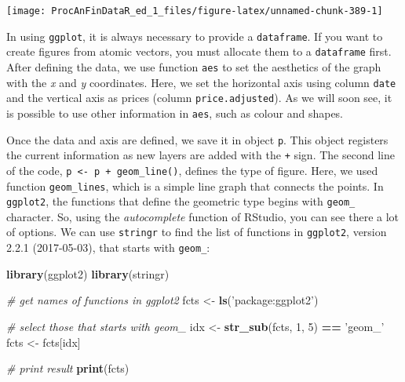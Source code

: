 \documentclass[11pt,]{book}
\newenvironment{Shaded}{\begin{snugshade}}{\end{snugshade}}
\newcommand{\KeywordTok}[1]{\textcolor[rgb]{0.27,0.27,0.27}{\textbf{#1}}}
\newcommand{\DecValTok}[1]{\textcolor[rgb]{0.06,0.06,0.06}{#1}}
\newcommand{\StringTok}[1]{\textcolor[rgb]{0.5,0.5,0.5}{#1}}
\newcommand{\CommentTok}[1]{\textcolor[rgb]{0.56,0.35,0.01}{\textit{#1}}}
\newcommand{\OperatorTok}[1]{\textcolor[rgb]{0.81,0.36,0.00}{\textbf{#1}}}
\newcommand{\NormalTok}[1]{#1}
\begin{document}
\begin{center}\texttt{[image: ProcAnFinDataR\_ed\_1\_files/figure-latex/unnamed-chunk-389-1]} \end{center}

In using \texttt{ggplot}, it is always necessary to provide a
\texttt{dataframe}. If you want to create figures from atomic vectors,
you must allocate them to a \texttt{dataframe} first. After defining the
data, we use function \texttt{aes} to set the aesthetics of the graph
with the \emph{x} and \emph{y} coordinates. Here, we set the horizontal
axis using column \texttt{date} and the vertical axis as prices (column
\texttt{price.adjusted}). As we will soon see, it is possible to use
other information in \texttt{aes}, such as colour and shapes.

Once the data and axis are defined, we save it in object \texttt{p}.
This object registers the current information as new layers are added
with the \texttt{+} sign. The second line of the code,
\texttt{p\ \textless{}-\ p\ +\ geom\_line()}, defines the type of
figure. Here, we used function \texttt{geom\_lines}, which is a simple
line graph that connects the points. In \texttt{ggplot2}, the functions
that define the geometric type begins with \texttt{geom\_} character.
So, using the \emph{autocomplete} function of RStudio, you can see there
a lot of options. We can use \texttt{stringr} to find the list of
functions in \texttt{ggplot2}, version 2.2.1 (2017-05-03), that starts
with \texttt{geom\_}: 

\begin{Shaded}
\begin{Highlighting}[]
\KeywordTok{library}\NormalTok{(ggplot2)}
\KeywordTok{library}\NormalTok{(stringr)}

\CommentTok{# get names of functions in ggplot2}
\NormalTok{fcts <-}\StringTok{ }\KeywordTok{ls}\NormalTok{(}\StringTok{'package:ggplot2'}\NormalTok{)}

\CommentTok{# select those that starts with geom_}
\NormalTok{idx <-}\StringTok{ }\KeywordTok{str_sub}\NormalTok{(fcts, }\DecValTok{1}\NormalTok{, }\DecValTok{5}\NormalTok{) }\OperatorTok{==}\StringTok{ 'geom_'}
\NormalTok{fcts <-}\StringTok{ }\NormalTok{fcts[idx]}

\CommentTok{# print result}
\KeywordTok{print}\NormalTok{(fcts)}
\end{Highlighting}
\end{Shaded}
\end{document}
